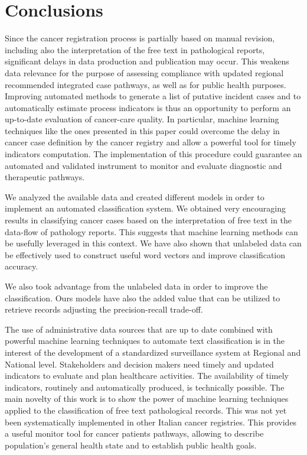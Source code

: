 \section{Conclusions}
Since the cancer registration process is partially based on manual
revision, including also the interpretation of the free text in
pathological reports, significant delays in data production and
publication may occur. This weakens data relevance for the purpose of
assessing compliance with updated regional recommended integrated case
pathways, as well as for public health purposes. Improving automated
methods to generate a list of putative incident cases and to
automatically estimate process indicators is thus an opportunity to
perform an up-to-date evaluation of cancer-care quality. In
particular, machine learning techniques like the ones presented in
this paper could overcome the delay in cancer case definition by the
cancer registry and allow a powerful tool for timely indicators
computation. The implementation of this procedure could guarantee an
automated and validated instrument to monitor and evaluate diagnostic
and therapeutic pathways.

We analyzed the available data and created different models in order
to implement an automated classification system. We obtained very
encouraging results in classifying cancer cases based on the
interpretation of free text in the data-flow of pathology
reports. This suggests that machine learning methods can be usefully
leveraged in this context.  We have also shown that unlabeled data can
be effectively used to construct useful word vectors and improve
classification accuracy. 

We also took advantage from the unlabeled data in order to improve
the classification. Ours models have also the added value that can be
utilized to retrieve records adjusting the precision-recall trade-off.

The use of administrative data sources that are up to date combined
with powerful machine learning techniques to automate text
classification is in the interest of the development of a standardized
surveillance system at Regional and National level. Stakeholders and
decision makers need timely and updated indicators to evaluate and
plan healthcare activities. The availability of timely indicators,
routinely and automatically produced, is technically possible. The
main novelty of this work is to show the power of machine learning
techniques applied to the classification of free text pathological
records. This was not yet been systematically implemented in other
Italian cancer registries. This provides a useful monitor tool for
cancer patients pathways, allowing to describe population’s general
health state and to establish public health goals.


